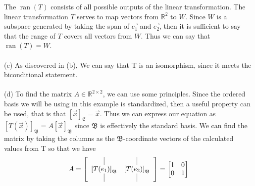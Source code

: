 \documentclass{report}
\begin{document}
The $\operatorname{ran}(T)$ consists of all possible outputs of the linear transformation. The linear transformation $T$ serves to map vectors from $\mathbb{R}^2$ to $W$. Since $W$ is a subspace generated by taking the span of $\vec{e_1}$ and $\vec{e_2}$, then it is sufficient to say that the range of $T$ covers all vectors from $W$. Thus we can say that $\operatorname{ran}(T) = W$. \\
\\
\noindent (c) As discovered in (b), We can say that T is an isomorphism, since it meets the biconditional statement. \\
\\
\noindent (d) To find the matrix $A\in\mathbb{R}^{2\times2}$, we can use some principles. Since the ordered basis we will be using in this example is standardized, then a useful property can be used, that is that $[\vec{x}]_{\mathfrak{E}} = \vec{x}$. Thus we can express our equation as $[T(\vec{x})]_{\mathfrak{B}} = A[\vec{x}]_{\mathfrak{B}}$ since $\mathfrak{B}$ is effectively the standard basis. We can find the matrix by taking the columns as the $\mathfrak{B}$-coordinate vectors of the calculated values from T so that we have
$$
A = \left[
  \begin{array}{cc}
    \vrule & \vrule \\
    \left[T(e_{1})\right]_{\mathfrak{B}} & \left[T(e_{2})\right]_{\mathfrak{B}}\\
    \vrule & \vrule 
  \end{array}
\right] = \begin{bmatrix} 1 & 0 \\ 0 & 1 \end{bmatrix}
$$
\end{document}
